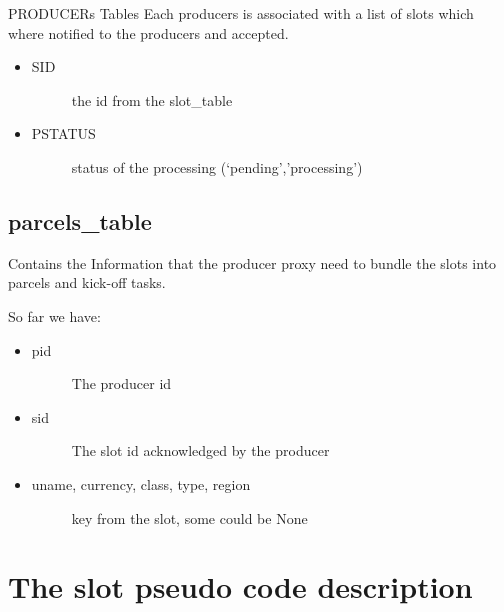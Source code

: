 \documentclass[letterpaper,10pt,english]{sphinxmanual}
\begin{document}
PRODUCERs Tables
Each producers is associated with a list of slots which where notified to the producers and accepted.
\begin{itemize}
\item {} \begin{description}
\item[{SID}] \leavevmode
the id from the slot\_table

\end{description}

\item {} \begin{description}
\item[{PSTATUS}] \leavevmode
status of the processing (‘pending’,’processing’)

\end{description}

\end{itemize}


\section{parcels\_table}
\label{\detokenize{mrb:parcels-table}}
Contains the Information that the producer proxy need to bundle the slots into
parcels and kick-off tasks.

So far we have:
\begin{itemize}
\item {} \begin{description}
\item[{pid}] \leavevmode
The producer id

\end{description}

\item {} \begin{description}
\item[{sid}] \leavevmode
The slot id acknowledged by the producer

\end{description}

\item {} \begin{description}
\item[{uname, currency, class, type, region}] \leavevmode
key from the slot, some could be None

\end{description}

\end{itemize}


\chapter{The slot pseudo code description}
\label{\detokenize{slots:the-slot-pseudo-code-description}}\label{\detokenize{slots::doc}}
\end{document}
